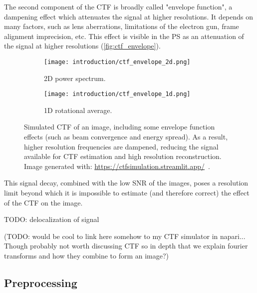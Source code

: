 The second component of the CTF is broadly called "envelope function", a dampening effect which attenuates the signal at higher resolutions.
It depends on many factors, such as lens aberrations, limitations of the electron gun, frame alignment imprecision, etc.
This effect is visible in the PS as an attenuation of the signal at higher resolutions (\autoref{fig:ctf_envelope}).

\begin{figure}[ht]
    \centering
    \begin{subfigure}[B]{.42\textwidth}
        \centering
        \texttt{[image: introduction/ctf\_envelope\_2d.png]}
        \caption{2D power spectrum.}
        \label{fig:ctf_envelope_2d}
    \end{subfigure}%
    \hfill
    \begin{subfigure}[B]{.55\textwidth}
        \centering
        \texttt{[image: introduction/ctf\_envelope\_1d.png]}
        \caption{1D rotational average.}
        \label{fig:ctf_envelope_1d}
    \end{subfigure}%
    \caption[CTF: effect of the envelope function]{Simulated CTF of an image, including some envelope function effects (such as beam convergence and energy spread). As a result, higher resolution frequencies are dampened, reducing the signal available for CTF estimation and high resolution reconstruction. Image generated with: \url{https://ctfsimulation.streamlit.app/}~\cite{jiangWebbasedSimulationContrast2001}.}
    \label{fig:ctf_envelope}
\end{figure}

This signal decay, combined with the low SNR of the images, poses a resolution limit beyond which it is impossible to estimate (and therefore correct) the effect of the CTF on the image.

TODO: delocalization of signal

(TODO: would be cool to link here somehow to my CTF simulator in napari... Though probably not worth discussing CTF so in depth that we explain fourier transforms and how they combine to form an image?)

\subsection{Preprocessing}

